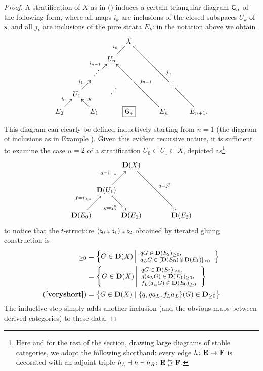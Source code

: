 \begin{proof}
A stratification of $X$ as in () induces a certain triangular diagram $\mathsf{G}_n$ of the following form, where all maps $i_k$ are inclusions of the closed subspaces $U_k$ of $\mathsf{s}$, and all $j_k$ are inclusions of the pure strata $E_k$: in the notation above we obtain 
\[\label{pyram}
\xymatrix@!R=.25mm@!C=.25mm{
  	& 	& 	& 	& X \\
  	& 	& 	& U_n	& 	&  \\
  	& 	& \iddots	& 	& 	& 	&  \\
  	& U_1	& 	& \iddots	& 	& 	& 	&  \\
  E_0	& 	& E_1	& 	& \boxed{\dgrm{G}_n}	& 	& E_n	& 	& E_{n+1}.
  \ar@{<-} "1,5";"2,4" _{i_n}
  \ar@{<-} "2,4";"3,3" _{i_{n-1}}
  \ar "4,2";"3,3" ^{i_1}
  \ar "5,1";"4,2" ^{i_0}
  \ar "5,3";"4,2" _{j_0}
  \ar "5,7";"2,4" _{j_{n-1}}
  \ar "5,9";"1,5" _{j_n}
}
\] This diagram can clearly be defined inductively starting from $n=1$ (the diagram of inclusions as in Example ).  Given this evident recursive nature, it is sufficient to examine the case $n=2$ of a stratification $U_0\subset U_1\subset X$, depicted as\footnote{Here and for the rest of the section, drawing large diagrams of stable categories, we adopt the following shorthand: every edge $h\colon \mathbf{E}\to \mathbf{F}$ is decorated with an adjoint triple $h_L\dashv h\dashv h_R\colon \cate{E}\lrlarrows \cate{F}$.}
\[
  \xymatrix@!R=4mm@!C=4mm{
    	& 	& \D(X) \\
    	& \D (U_1)	& 	&  \\
    \D (E_0)	& 	& \D(E_1)	& 	& \D (E_2)
    \ar "1,3";"3,5" ^{q=j_1^*}
    \ar "2,2";"1,3" ^{a=i_{1,*}}
    \ar "2,2";"3,3" _{g=j_0^*}
    \ar "3,1";"2,2" ^{f=i_{0,*}}
  }
\] to notice that the $t$\hyp{}structure $(\tee_0\glue \tee_1)\glue \tee_2$ obtained by iterated gluing construction is 
\begin{align*}
[(\D(E_0)\glue \D(E_1))\glue \D(E_2)]_{\ge 0} &= \left\{
	  G\in\D(X)\left|\footnotesize 
       	\begin{array}{l}
	  qG \in \D(E_2)_{\ge 0}, \\ 
	  a_L G\in [\D(E_0)\glue \D(E_1)]_{\ge 0} 
	  \end{array}\right.
   \right\}\\
& = \left\{
       G\in\D(X) \left|\footnotesize 
       	\begin{array}{l}
			qG \in \D(E_2)_{\ge 0}, \\ 
			g(a_L G)\in \D(E_1)_{\ge 0}, \\ 
			f_L(a_L G) \in \D (E_0)_{\ge 0}
		\end{array}
		\right.
	\right\}\\
\protect{(\refbf{veryshort})} & = \big\{ G\in\D(X) \mid \{q, g a_L, f_L a_L\}(G)\in \D_{\ge 0} \big\}
\end{align*}
The inductive step simply adds another inclusion (and the obvious maps between derived categories) to these data.
\end{proof}
